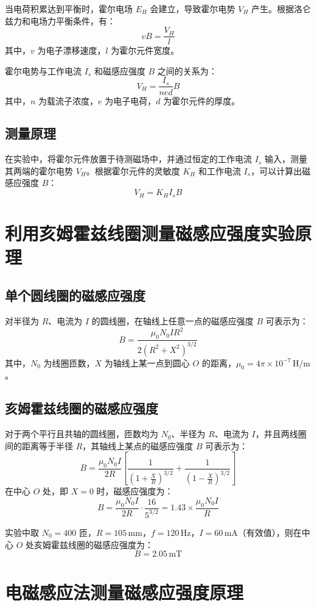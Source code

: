 \documentclass[a4paper,10pt]{article}
\begin{document}
当电荷积累达到平衡时，霍尔电场 \( E_H \) 会建立，导致霍尔电势 \( V_H \) 产生。根据洛仑兹力和电场力平衡条件，有：
\[
v B = \frac{V_H}{l}
\]
其中，\( v \) 为电子漂移速度，\( l \) 为霍尔元件宽度。

霍尔电势与工作电流 \( I_s \) 和磁感应强度 \( B \) 之间的关系为：
\[
V_H = \frac{I_s}{n e d} B
\]
其中，\( n \) 为载流子浓度，\( e \) 为电子电荷，\( d \) 为霍尔元件的厚度。

\subsection{测量原理}
在实验中，将霍尔元件放置于待测磁场中，并通过恒定的工作电流 \( I_s \) 输入，测量其两端的霍尔电势 \( V_H \)。根据霍尔元件的灵敏度 \( K_H \) 和工作电流 \( I_s \)，可以计算出磁感应强度 \( B \)：
\[
V_H = K_H I_s B
\]

\section{利用亥姆霍兹线圈测量磁感应强度实验原理}


\subsection{单个圆线圈的磁感应强度}
对半径为 \( R \)、电流为 \( I \) 的圆线圈，在轴线上任意一点的磁感应强度 \( B \) 可表示为：
\[
B = \frac{\mu_0 N_0 I R^2}{2 (R^2 + X^2)^{3/2}}
\]
其中，\( N_0 \) 为线圈匝数，\( X \) 为轴线上某一点到圆心 \( O \) 的距离，\( \mu_0 = 4\pi \times 10^{-7} \, \text{H/m} \)。

\subsection{亥姆霍兹线圈的磁感应强度}
对于两个平行且共轴的圆线圈，匝数均为 \( N_0 \)、半径为 \( R \)、电流为 \( I \)，并且两线圈间的距离等于半径 \( R \)，其轴线上某点的磁感应强度 \( B \) 可表示为：
\[
B = \frac{\mu_0 N_0 I}{2R} \left[ \frac{1}{\left(1 + \frac{X}{R}\right)^{3/2}} + \frac{1}{\left(1 - \frac{X}{R}\right)^{3/2}} \right]
\]
在中心 \( O \) 处，即 \( X = 0 \) 时，磁感应强度为：
\[
B = \frac{\mu_0 N_0 I}{2R} \cdot \frac{16}{5^{3/2}} = 1.43 \times \frac{\mu_0 N_0 I}{R}
\]

实验中取 \( N_0 = 400 \) 匝，\( R = 105 \, \text{mm} \)，\( f = 120 \, \text{Hz} \)，\( I = 60 \, \text{mA} \)（有效值），则在中心 \( O \) 处亥姆霍兹线圈的磁感应强度为：
\[
B = 2.05 \, \text{mT}
\]
\section{电磁感应法测量磁感应强度原理}
\end{document}
